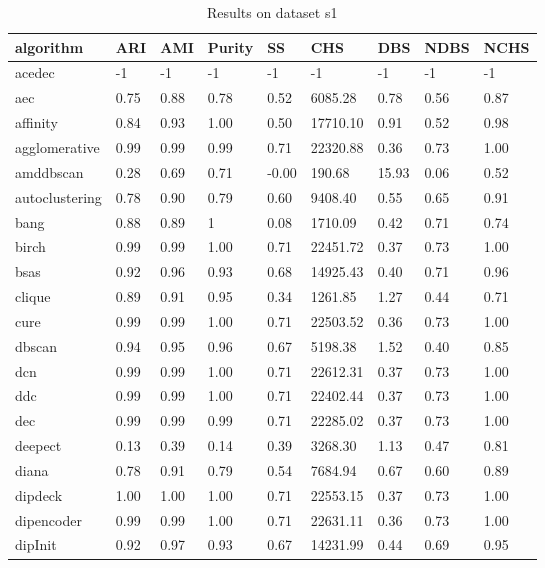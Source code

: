 


\begin{table}[H]
\centering
\caption{Results on dataset s1}
\label{S65_Table}
\begin{tabular}{|l|l|l|l|l|l|l|l|l|}
\hline
algorithm & ARI & AMI & Purity & SS & CHS & DBS & NDBS & NCHS \\
\hline
acedec & -1 & -1 & -1 & -1 & -1 & -1 & -1 & -1 \\
\hline
aec & 0.75 & 0.88 & 0.78 & 0.52 & 6085.28 & 0.78 & 0.56 & 0.87 \\
\hline
affinity & 0.84 & 0.93 & 1.00 & 0.50 & 17710.10 & 0.91 & 0.52 & 0.98 \\
\hline
agglomerative & 0.99 & 0.99 & 0.99 & 0.71 & 22320.88 & 0.36 & 0.73 & 1.00 \\
\hline
amddbscan & 0.28 & 0.69 & 0.71 & -0.00 & 190.68 & 15.93 & 0.06 & 0.52 \\
\hline
autoclustering & 0.78 & 0.90 & 0.79 & 0.60 & 9408.40 & 0.55 & 0.65 & 0.91 \\
\hline
bang & 0.88 & 0.89 & 1 & 0.08 & 1710.09 & 0.42 & 0.71 & 0.74 \\
\hline
birch & 0.99 & 0.99 & 1.00 & 0.71 & 22451.72 & 0.37 & 0.73 & 1.00 \\
\hline
bsas & 0.92 & 0.96 & 0.93 & 0.68 & 14925.43 & 0.40 & 0.71 & 0.96 \\
\hline
clique & 0.89 & 0.91 & 0.95 & 0.34 & 1261.85 & 1.27 & 0.44 & 0.71 \\
\hline
cure & 0.99 & 0.99 & 1.00 & 0.71 & 22503.52 & 0.36 & 0.73 & 1.00 \\
\hline
dbscan & 0.94 & 0.95 & 0.96 & 0.67 & 5198.38 & 1.52 & 0.40 & 0.85 \\
\hline
dcn & 0.99 & 0.99 & 1.00 & 0.71 & 22612.31 & 0.37 & 0.73 & 1.00 \\
\hline
ddc & 0.99 & 0.99 & 1.00 & 0.71 & 22402.44 & 0.37 & 0.73 & 1.00 \\
\hline
dec & 0.99 & 0.99 & 0.99 & 0.71 & 22285.02 & 0.37 & 0.73 & 1.00 \\
\hline
deepect & 0.13 & 0.39 & 0.14 & 0.39 & 3268.30 & 1.13 & 0.47 & 0.81 \\
\hline
diana & 0.78 & 0.91 & 0.79 & 0.54 & 7684.94 & 0.67 & 0.60 & 0.89 \\
\hline
dipdeck & 1.00 & 1.00 & 1.00 & 0.71 & 22553.15 & 0.37 & 0.73 & 1.00 \\
\hline
dipencoder & 0.99 & 0.99 & 1.00 & 0.71 & 22631.11 & 0.36 & 0.73 & 1.00 \\
\hline
dipInit & 0.92 & 0.97 & 0.93 & 0.67 & 14231.99 & 0.44 & 0.69 & 0.95 \\

\end{tabular}
\end{table}
